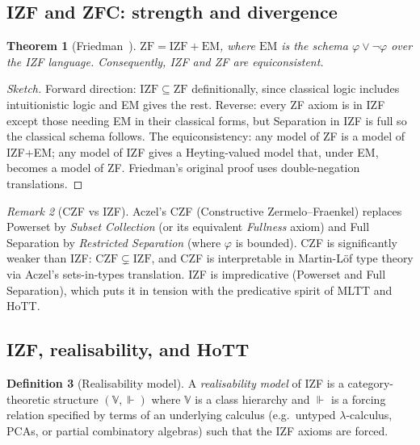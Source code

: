 \documentclass[12pt]{article}
\newtheorem{theorem}{Theorem}[section]
\theoremstyle{definition}
\newtheorem{definition}[theorem]{Definition}
\theoremstyle{remark}
\newtheorem{remark}[theorem]{Remark}
\begin{document}
\subsection{IZF and ZFC: strength and divergence}

\begin{theorem}[Friedman~\cite{Friedman1973}]
\label{thm:friedman}
$\mathrm{ZF} = \mathrm{IZF} + \mathrm{EM}$, where $\mathrm{EM}$ is the schema
$\varphi\vee\neg\varphi$ over the IZF language. Consequently, IZF and ZF are equiconsistent.
\end{theorem}
\begin{proof}[Sketch]
Forward direction: $\mathrm{IZF}\subseteq \mathrm{ZF}$ definitionally, since classical
logic includes intuitionistic logic and EM gives the rest. Reverse: every ZF axiom is in
IZF except those needing EM in their classical forms, but Separation in IZF is full so
the classical schema follows. The equiconsistency: any model of ZF is a model of
IZF+EM; any model of IZF gives a Heyting-valued model that, under EM, becomes a model of
ZF. Friedman's original proof uses double-negation translations.
\end{proof}

\begin{remark}[CZF vs IZF]
Aczel's CZF (Constructive Zermelo--Fraenkel) replaces Powerset by \emph{Subset Collection}
(or its equivalent \emph{Fullness} axiom) and Full Separation by \emph{Restricted
Separation} (where $\varphi$ is bounded). CZF is significantly weaker than IZF:
$\mathrm{CZF} \subsetneq \mathrm{IZF}$, and CZF is interpretable in Martin-L\"of type
theory via Aczel's sets-in-types translation. IZF is impredicative
(Powerset and Full Separation), which puts it in tension with the predicative spirit of
MLTT and HoTT.
\end{remark}

\subsection{IZF, realisability, and HoTT}

\begin{definition}[Realisability model]
A \emph{realisability model} of IZF is a category-theoretic structure
$(\mathbb{V}, \Vdash)$ where $\mathbb{V}$ is a class hierarchy and $\Vdash$ is a forcing
relation specified by terms of an underlying calculus (e.g.\ untyped $\lambda$-calculus,
PCAs, or partial combinatory algebras) such that the IZF axioms are forced.
\end{definition}
\end{document}
